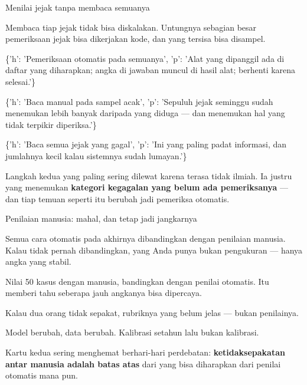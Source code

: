 \documentclass[aspectratio=169,11pt,t]{beamer}
\begin{document}
\begin{frame}[shrink=25]{Menilai jejak tanpa membaca semuanya}
{\fontsize{9.4}{12.6}\selectfont\color{fg2}Membaca tiap jejak tidak bisa diskalakan. Untungnya sebagian besar pemeriksaan jejak bisa dikerjakan kode, dan yang tersisa bisa disampel.\par}\vskip 4pt
\begin{isteps}
\item \{'h': 'Pemeriksaan otomatis pada semuanya', 'p': 'Alat yang dipanggil ada di daftar yang diharapkan; angka di jawaban muncul di hasil alat; berhenti karena selesai.'\}
\item \{'h': 'Baca manual pada sampel acak', 'p': 'Sepuluh jejak seminggu sudah menemukan lebih banyak daripada yang diduga --- dan menemukan hal yang tidak terpikir diperiksa.'\}
\item \{'h': 'Baca semua jejak yang gagal', 'p': 'Ini yang paling padat informasi, dan jumlahnya kecil kalau sistemnya sudah lumayan.'\}
\end{isteps}
\begin{iband}[signal]
Langkah kedua yang paling sering dilewat karena terasa tidak ilmiah. Ia justru yang menemukan \textbf{kategori kegagalan yang belum ada pemeriksanya} --- dan tiap temuan seperti itu berubah jadi pemeriksa otomatis.
\end{iband}
\end{frame}

\begin{frame}[shrink=25]{Penilaian manusia: mahal, dan tetap jadi jangkarnya}
{\fontsize{9.4}{12.6}\selectfont\color{fg2}Semua cara otomatis pada akhirnya dibandingkan dengan penilaian manusia. Kalau tidak pernah dibandingkan, yang Anda punya bukan pengukuran --- hanya angka yang stabil.\par}\vskip 4pt
\begin{minipage}[t]{0.3253\textwidth}
\begin{icard}
Nilai 50 kasus dengan manusia, bandingkan dengan penilai otomatis. Itu memberi tahu seberapa jauh angkanya bisa dipercaya.
\end{icard}
\end{minipage}%
\hfill
\begin{minipage}[t]{0.3253\textwidth}
\begin{icard}
Kalau dua orang tidak sepakat, rubriknya yang belum jelas --- bukan penilainya.
\end{icard}
\end{minipage}%
\hfill
\begin{minipage}[t]{0.3253\textwidth}
\begin{icard}
Model berubah, data berubah. Kalibrasi setahun lalu bukan kalibrasi.
\end{icard}
\end{minipage}%
\begin{iband}[signal]
Kartu kedua sering menghemat berhari-hari perdebatan: \textbf{ketidaksepakatan antar manusia adalah batas atas} dari yang bisa diharapkan dari penilai otomatis mana pun.
\end{iband}
\end{frame}
\end{document}
